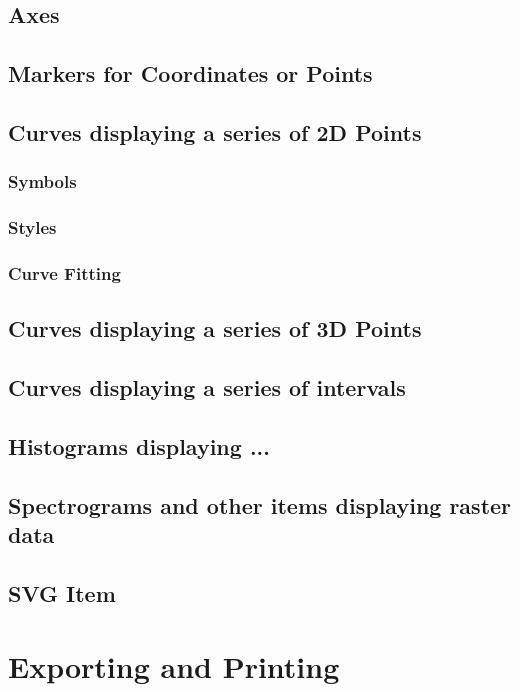 \documentclass[12pt,a4paper]{book}
\begin{document}
\section{Axes}

\section{Markers for Coordinates or Points}
\section{Curves displaying a series of 2D Points}

\subsection{Symbols}
\subsection{Styles}
\subsection{Curve Fitting}


\section{Curves displaying a series of 3D Points}
\section{Curves displaying a series of intervals}
\section{Histograms displaying ...}

\section{Spectrograms and other items displaying raster data}

\section{SVG Item}

\chapter{Exporting and Printing}
\end{document}

